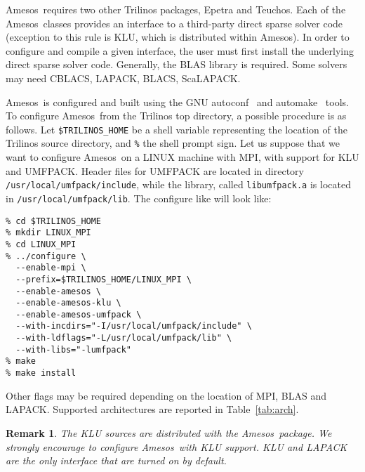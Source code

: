 \documentclass[11pt]{SANDreport}
\newcommand{\amesos}{{\sc Amesos}}
\newtheorem{remark}{Remark}
\begin{document}
\amesos\ requires two other {\sc Trilinos} packages, {\sc Epetra} and {\sc
  Teuchos}. 
Each of the \amesos\ classes provides an interface to a third-party direct
sparse solver code (exception to this rule is KLU, which is
  distributed within \amesos). In order to configure and compile a given
interface, the user must first install the underlying direct sparse
solver code. Generally, the BLAS library is required. Some solvers may
need CBLACS, LAPACK, BLACS, ScaLAPACK. 

\amesos\ is configured and built using the GNU autoconf~\cite{Autoconf}
and automake~\cite{Automake} tools. To configure \amesos\ from the
Trilinos top directory, a possible procedure is as follows.  Let
\verb!$TRILINOS_HOME! be a shell variable representing the location
of the Trilinos source directory, and \verb!%! the shell prompt sign.  
Let us suppose that we want to configure \amesos\ on a
LINUX machine with MPI, with support
for KLU and UMFPACK. Header files for UMFPACK are located
in directory \verb!/usr/local/umfpack/include!, while the library,
called \verb!libumfpack.a! is located in \verb!/usr/local/umfpack/lib!.
The configure like will look like:
\begin{verbatim}
% cd $TRILINOS_HOME
% mkdir LINUX_MPI
% cd LINUX_MPI
% ../configure \
  --enable-mpi \
  --prefix=$TRILINOS_HOME/LINUX_MPI \
  --enable-amesos \
  --enable-amesos-klu \
  --enable-amesos-umfpack \
  --with-incdirs="-I/usr/local/umfpack/include" \
  --with-ldflags="-L/usr/local/umfpack/lib" \
  --with-libs="-lumfpack"
% make
% make install
\end{verbatim}
Other flags may be required depending on the location of
 MPI, BLAS and LAPACK. Supported architectures are reported 
 in Table~\ref{tab:arch}.

\begin{remark}
The KLU sources are distributed with the \amesos\ package. We strongly
encourage to configure \amesos\ with KLU support. KLU and LAPACK are the only
interface that are turned on by default.
\end{remark}
\end{document}
